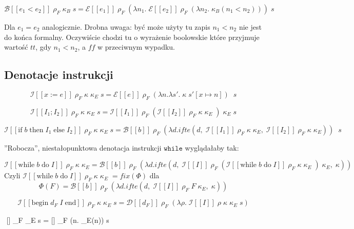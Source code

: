 \documentclass[a4paper]{article}
\begin{document}
$$
\mathcal{B}[\![ e_1 < e_2 ]\!] \; \rho_F \; \kappa_B \; s = \mathcal{E}[\![e_1]\!] \; \rho_F \; (\lambda n_1. \;
\mathcal{E}[\![e_2]\!] \; \rho_F \; (\lambda n_2. \;
\kappa_B (n_1 < n_2))) \; s
$$

Dla $e_1 = e_2$ analogicznie. Drobna uwaga: być może użyty tu zapis $n_1 < n_2$ nie jest do końca formalny. Oczywiście chodzi tu o wyrażenie boolowskie które przyjmuje wartość $tt$, gdy $n_1 < n_2$, a $ff$ w przeciwnym wypadku.


\subsection*{Denotacje instrukcji}

$$
\mathcal{I}[\![ x := e ]\!] \; \rho_F \; \kappa \; \kappa_E \; s = \mathcal{E}[\![ e ]\!] \; \rho_F \; (\lambda n. \lambda s'. \; \kappa \; s'[x \mapsto n]) \; \; s
$$

$$
\mathcal{I}[\![ I_1; I_2 ]\!] \; \rho_F \; \kappa \; \kappa_E \; s = \mathcal{I}[\![ I_1 ]\!] \; \rho_F \; (
\mathcal{I}[\![ I_2 ]\!] \; \rho_F \; \kappa \; \kappa_E \;
) \; \kappa_E \; s
$$

$$
\mathcal{I}[\![ \text{if} \; b \; \text{then} \; I_1 \; \text{else} \; I_2 ]\!] \; \rho_F \; \kappa \; \kappa_E \; s = \mathcal{B}[\![ b ]\!] \; \rho_F \; (\lambda d. ifte (d, \;
\mathcal{I}[\![ I_1 ]\!] \; \rho_F \; \kappa \; \kappa_E
, \; 
\mathcal{I}[\![ I_2 ]\!] \; \rho_F \; \kappa \; \kappa_E
)) \; \; s
$$

''Robocza'', niestałopunktowa denotacja instrukcji $\texttt{while}$ wyglądałaby tak:

$$
\mathcal{I}[\![ \text{while} \; b \; \text{do} \; I  ]\!] \; \rho_F \; \kappa \; \kappa_E = \mathcal{B}[\![ b ]\!] \; \rho_F \; (\lambda d. ifte (d, \;
\mathcal{I}[\![ I ]\!] \; \rho_F \; (
\mathcal{I}[\![ \text{while} \; b \; \text{do} \; I ]\!] \; \rho_F \; \kappa \; \kappa_E \;
) \; \kappa_E
, \; 
\kappa
))
$$
Czyli $\mathcal{I}[\![ \text{while} \; b \; \text{do} \; I  ]\!] \; \rho_F \; \kappa \; \kappa_E \; = fix(\Phi)$ dla
$$
\Phi (F) = \mathcal{B}[\![ b ]\!] \; \rho_F \; (\lambda d. ifte (d, \;
\mathcal{I}[\![ I ]\!] \; \rho_F \; F \; \kappa_E
, \; 
\kappa
))
$$

$$
\mathcal{I}[\![ \text{begin} \; d_F \; I \; \text{end} ]\!] \; \rho_F \; \kappa \; \kappa_E \; s = 
\mathcal{D}[\![ d_F ]\!] \; \rho_F \; (\lambda \rho. \;
\mathcal{I}[\![ I ]\!] \; \rho \; \kappa \; \kappa_E \; s )
$$

$$
[\!] \; \rho_F \; \kappa \; \kappa_E \; s = 
 [\![e]\!] \; \rho_F \; (\lambda n. \; \kappa_E(n)) \; s
\end{document}
